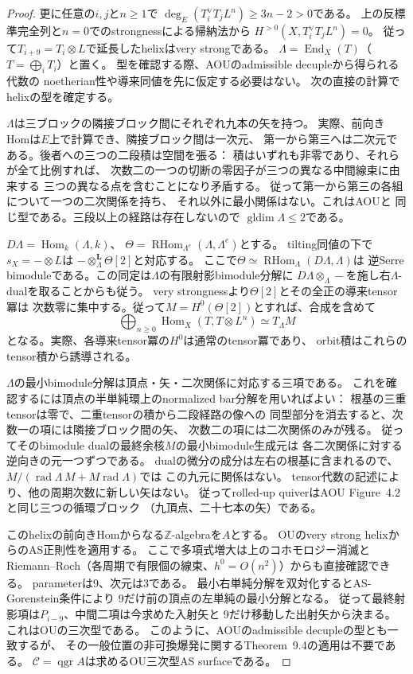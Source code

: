 \documentclass[11pt,a4paper]{ltjsarticle}
\theoremstyle{definition}
\newcommand{\qgr}{\operatorname{qgr}}
\begin{document}
\begin{proof}
更に任意の$i,j$と$n\geq1$で
$\deg_E(T_i^\vee T_j L^n)\geq3n-2>0$である。
上の反標準完全列と$n=0$でのstrongnessによる帰納法から
$H^{>0}(X,T_i^\vee T_j L^n)=0$。
従って$T_{i+9}=T_i\otimes L$で延長したhelixはvery strongである。
$\Lambda=\operatorname{End}_X(T)$（$T=\bigoplus_iT_i$）と置く。
型を確認する際、AOUのadmissible decupleから得られる代数の
noetherian性や導来同値を先に仮定する必要はない。
次の直接の計算でhelixの型を確定する。

$\Lambda$は三ブロックの隣接ブロック間にそれぞれ九本の矢を持つ。
実際、前向きHomは$E$上で計算でき、隣接ブロック間は一次元、
第一から第三へは二次元である。後者への三つの二段積は空間を張る：
積はいずれも非零であり、それらが全て比例すれば、
次数二の一つの切断の零因子が三つの異なる中間線束に由来する
三つの異なる点を含むことになり矛盾する。
従って第一から第三の各組について一つの二次関係を持ち、
それ以外に最小関係はない。これはAOU\cite[(4.1), (4.2)]{AOU2024}と
同じ型である。三段以上の経路は存在しないので
$\operatorname{gldim}\Lambda\leq2$である。

$D\Lambda=\operatorname{Hom}_k(\Lambda,k)$、
$\Theta=\operatorname{RHom}_{\Lambda^e}(\Lambda,\Lambda^e)$とする。
tilting同値の下で$s_X=-\otimes L$は
$-\otimes_\Lambda^{\mathbf L}\Theta[2]$と対応する。
ここで$\Theta\simeq\operatorname{RHom}_\Lambda(D\Lambda,\Lambda)$は
逆Serre bimoduleである。この同定は$\Lambda$の有限射影bimodule分解に
$D\Lambda\otimes_\Lambda-$を施し右$\Lambda$-dualを取ることからも従う。
very strongnessより$\Theta[2]$とその全正の導来tensor冪は
次数零に集中する。従って$M=H^0(\Theta[2])$とすれば、合成を含めて
\[
 \bigoplus_{n\geq0}\operatorname{Hom}_X(T,T\otimes L^n)
       \simeq T_\Lambda M
\]
となる。実際、各導来tensor冪の$H^0$は通常のtensor冪であり、
orbit積はこれらのtensor積から誘導される。

$\Lambda$の最小bimodule分解は頂点・矢・二次関係に対応する三項である。
これを確認するには頂点の半単純環上のnormalized bar分解を用いればよい：
根基の三重tensorは零で、二重tensorの積から二段経路の像への
同型部分を消去すると、次数一の項には隣接ブロック間の矢、
次数二の項には二次関係のみが残る。
従ってそのbimodule dualの最終余核$M$の最小bimodule生成元は
各二次関係に対する逆向きの元一つずつである。
dualの微分の成分は左右の根基に含まれるので、
$M/(\operatorname{rad}\Lambda\,M+M\operatorname{rad}\Lambda)$では
この九元に関係はない。
tensor代数の記述により、他の周期次数に新しい矢はない。
従ってrolled-up quiverはAOU Figure~4.2と同じ三つの循環ブロック
（九頂点、二十七本の矢）である。

このhelixの前向きHomからなる$\mathbb Z$-algebraを$A$とする。
OU\cite[Section~3]{OU}のvery strong helixからのAS正則性を適用する。
ここで多項式増大は上のコホモロジー消滅と
Riemann--Roch（各周期で有限個の線束、$h^0=O(n^2)$）からも直接確認できる。
parameterは9、次元は3である。
最小右単純分解を双対化するとAS-Gorenstein条件により
9だけ前の頂点の左単純の最小分解となる。
従って最終射影項は$P_{i-9}$、中間二項は今求めた入射矢と
9だけ移動した出射矢から決まる。
これはOU\cite[Definition~5.2, (5.4)]{OU}の三次型である。
このように、AOUのadmissible decupleの型とも一致するが、
その一般位置の非可換爆発に関するTheorem~9.4の適用は不要である。
$\mathcal C=\qgr A$は求めるOU三次型AS surfaceである。


\end{proof}
\end{document}
